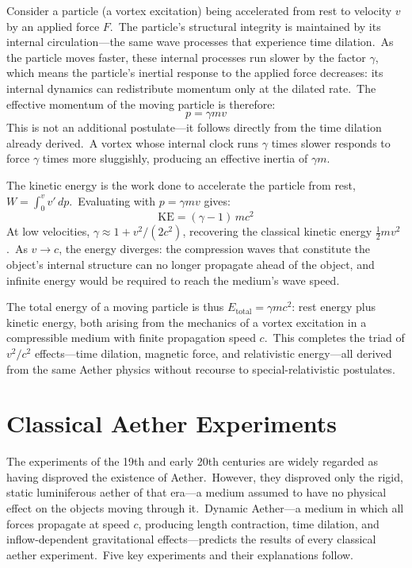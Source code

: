 ﻿\documentclass[12pt,letterpaper]{article}
\begin{document}
Consider a particle (a vortex excitation) being accelerated from rest to velocity
$v$ by an applied force $F$.\ The particle's structural integrity is maintained by
its internal circulation---the same wave processes that experience time dilation.\
As the particle moves faster, these internal processes run slower by the factor
$\gamma$, which means the particle's inertial response to the applied force
decreases: its internal dynamics can redistribute momentum only at the dilated
rate.\ The effective momentum of the moving particle is therefore:
%
\begin{equation}
  p = \gamma m v
  \label{eq:rel-momentum}
\end{equation}
%
This is not an additional postulate---it follows directly from the time dilation
already derived.\ A vortex whose internal clock runs $\gamma$ times slower responds
to force $\gamma$ times more sluggishly, producing an effective inertia of
$\gamma m$.

The kinetic energy is the work done to accelerate the particle from rest,
$W = \int_0^v v'\,dp$.\ Evaluating with $p = \gamma mv$ gives:
%
\begin{equation}
  \mathrm{KE} = (\gamma - 1)\,mc^2
\end{equation}
%
At low velocities, $\gamma \approx 1 + v^2/(2c^2)$, recovering the classical
kinetic energy $\tfrac{1}{2}mv^2$.\ As $v \to c$, the energy diverges: the
compression waves that constitute the object's internal structure can no longer
propagate ahead of the object, and infinite energy would be required to reach
the medium's wave speed.

The total energy of a moving particle is thus $E_{\mathrm{total}} = \gamma mc^2$:
rest energy plus kinetic energy, both arising from the mechanics of a vortex
excitation in a compressible medium with finite propagation speed $c$.\ This
completes the triad of $v^2/c^2$ effects---time dilation, magnetic force, and
relativistic energy---all derived from the same Aether physics without recourse to
special-relativistic postulates.


\section{Classical Aether Experiments}
\label{sec:classical-experiments}

The experiments of the 19th and early 20th centuries are widely regarded as having
disproved the existence of Aether.\ However, they disproved only the rigid, static
luminiferous aether of that era---a medium assumed to have no physical effect on the
objects moving through it.\ Dynamic Aether---a medium in which all forces
propagate at speed $c$, producing length contraction, time dilation, and
inflow-dependent gravitational effects---predicts the results of every
classical aether experiment.\ Five key experiments and their explanations
follow.
\end{document}
